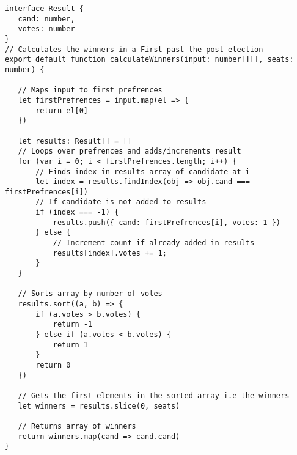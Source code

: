 \documentclass{article}
\begin{document}
\begin{verbatim}
interface Result {
   cand: number,
   votes: number
}
// Calculates the winners in a First-past-the-post election
export default function calculateWinners(input: number[][], seats: number) {

   // Maps input to first prefrences
   let firstPrefrences = input.map(el => {
       return el[0]
   })

   let results: Result[] = []
   // Loops over prefrences and adds/increments result
   for (var i = 0; i < firstPrefrences.length; i++) {
       // Finds index in results array of candidate at i
       let index = results.findIndex(obj => obj.cand === firstPrefrences[i])
       // If candidate is not added to results
       if (index === -1) {
           results.push({ cand: firstPrefrences[i], votes: 1 })
       } else {
           // Increment count if already added in results
           results[index].votes += 1;
       }
   }

   // Sorts array by number of votes
   results.sort((a, b) => {
       if (a.votes > b.votes) {
           return -1
       } else if (a.votes < b.votes) {
           return 1
       }
       return 0
   })

   // Gets the first elements in the sorted array i.e the winners
   let winners = results.slice(0, seats)

   // Returns array of winners
   return winners.map(cand => cand.cand)
}

\end{verbatim}
\end{document}
